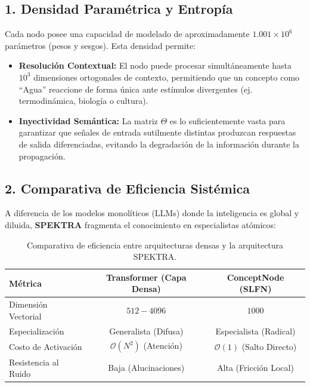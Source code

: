 \documentclass[12pt]{article}
\begin{document}
\subsection{1. Densidad Paramétrica y Entropía}
Cada nodo posee una capacidad de modelado de aproximadamente $1.001 \times 10^6$ parámetros (pesos y sesgos). Esta densidad permite:
\begin{itemize}
	\item \textbf{Resolución Contextual:} El nodo puede procesar simultáneamente hasta $10^3$ dimensiones ortogonales de contexto, permitiendo que un concepto como ``Agua'' reaccione de forma única ante estímulos divergentes (ej. termodinámica, biología o cultura).
	\item \textbf{Inyectividad Semántica:} La matriz $\Theta$ es lo suficientemente vasta para garantizar que señales de entrada sutilmente distintas produzcan respuestas de salida diferenciadas, evitando la degradación de la información durante la propagación.
\end{itemize}

\subsection{2. Comparativa de Eficiencia Sistémica}
A diferencia de los modelos monolíticos (LLMs) donde la inteligencia es global y diluida, \textbf{SPEKTRA} fragmenta el conocimiento en especialistas atómicos:

\begin{table}[h]
	\centering
	\begin{tabular}{|l|c|c|}
		\hline
		\textbf{Métrica} & \textbf{Transformer (Capa Densa)} & \textbf{ConceptNode (SLFN)} \\ \hline
		Dimensión Vectorial & $512 - 4096$ & $1000$ \\ \hline
		Especialización & Generalista (Difusa) & Especialista (Radical) \\ \hline
		Costo de Activación & $\mathcal{O}(N^2)$ (Atención) & $\mathcal{O}(1)$ (Salto Directo) \\ \hline
		Resistencia al Ruido & Baja (Alucinaciones) & Alta (Fricción Local) \\ \hline
	\end{tabular}
	\caption{Comparativa de eficiencia entre arquitecturas densas y la arquitectura SPEKTRA.}
\end{table}
\end{document}
